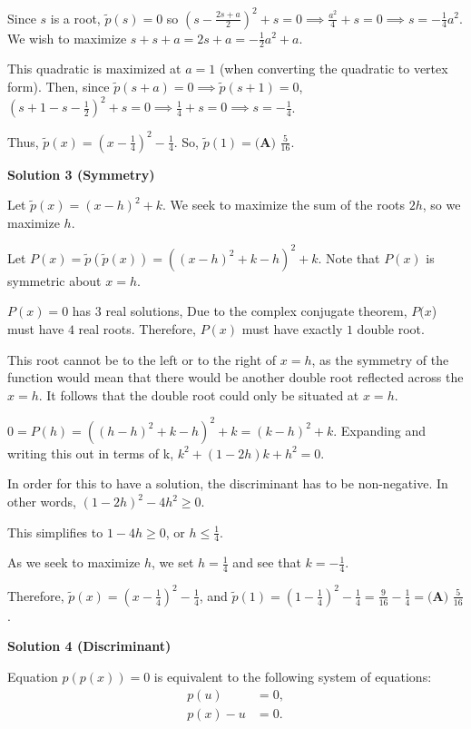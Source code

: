 \begin{enumerate}
 Since $s$ is a root, $\tilde{p}(s) = 0$ so $\left(s - \frac{2s + a}{2}\right)^2 +s = 0 \implies \frac{a^2}{4} + s = 0 \implies s = - \frac{1}{4} a^2$. We wish to maximize $s + s + a = 2s + a = - \frac{1}{2} a^2 + a$. 

 This quadratic is maximized at $a = 1$ (when converting the quadratic to vertex form). Then, since $\tilde{p}(s + a) = 0 \implies \tilde{p}(s+1) = 0$, $\left(s + 1 - s - \frac12\right)^2 + s = 0 \implies \frac{1}{4} + s = 0 \implies s = -\frac{1}{4}$. 

 Thus, $\tilde{p}(x) = \left(x - \frac{1}{4}\right)^2 - \frac{1}{4}$. So, $\tilde{p}(1) = \boxed{\textbf{(A) } \frac{5}{16}}$.

 



\textbf{Solution 3 (Symmetry)}

Let $\tilde p(x)=(x-h)^2+k$. We seek to maximize the sum of the roots $2h$, so we maximize $h$.

 Let $P(x)=\tilde p(\tilde p(x))=((x-h)^2+k-h)^2+k$. Note that $P(x)$ is symmetric about $x=h$. 

 $P(x)=0$ has $3$ real solutions, Due to the complex conjugate theorem, $P(x$) must have $4$ real roots. Therefore, $P(x)$ must have exactly $1$ double root. 

 This root cannot be to the left or to the right of $x=h$, as the symmetry of the function would mean that there would be another double root reflected across the $x=h$. It follows that the double root could only be situated at $x=h$. 

 $0=P(h)=((h-h)^2+k-h)^2+k=(k-h)^2+k$. Expanding and writing this out in terms of k, $k^2+(1-2h)k+h^2=0$. 

 In order for this to have a solution, the discriminant has to be non-negative. In other words, $(1-2h)^2-4h^2\geq0$. 

 This simplifies to $1-4h\geq0$, or $h\leq\frac{1}{4}$. 

 As we seek to maximize $h$, we set $h=\frac{1}{4}$ and see that $k=-\frac{1}{4}$. 

 Therefore, $\tilde p(x)=\left(x-\frac{1}{4}\right)^2-\frac{1}{4}$, and $\tilde p(1)=\left(1-\frac{1}{4}\right)^2-\frac{1}{4}=\frac{9}{16}-\frac{1}{4}=\boxed{\textbf{(A) } \frac{5}{16}}$.

 



\textbf{Solution 4 (Discriminant)}

Equation $p \left( p \left( x \right) \right) = 0$ is equivalent to the following system of equations:
 \begin{align*} p \left( u \right) &= 0, \\ p \left( x \right) - u &= 0. \end{align*}



\end{enumerate}
